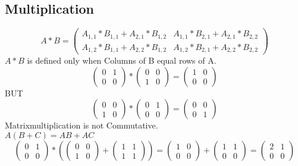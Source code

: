 \documentclass{article}
\begin{document}
	\subsection{Multiplication}
	\begin{equation*} 
		A*B = 
		\begin{pmatrix}
			A_{1,1}*B_{1,1}+A_{2,1}*B_{1,2} & A_{1,1}*B_{2,1}+A_{2,1}*B_{2,2} \\
			A_{1,2}*B_{1,1}+A_{2,2}*B_{1,2} & A_{1,2}*B_{2,1}+A_{2,2}*B_{2,2}
		\end{pmatrix}
	\end{equation*}
	$A*B$ is defined only when Columns of B equal rows of A.\\
	\begin{equation*} 
		\begin{pmatrix}
			0 & 1 \\
			0 & 0
		\end{pmatrix}
		*
		\begin{pmatrix}
			0 & 0 \\
			1 & 0
		\end{pmatrix} 
		= 
		\begin{pmatrix}
			1 & 0 \\
			0 & 0
		\end{pmatrix}
	\end{equation*}
	BUT\\
	\begin{equation*} 
	\begin{pmatrix}
		0 & 0 \\
		1 & 0
	\end{pmatrix} 
	*
	\begin{pmatrix}
		0 & 1 \\
		0 & 0
	\end{pmatrix}
	= 
	\begin{pmatrix}
		0 & 0 \\
		0 & 1
	\end{pmatrix}
	\end{equation*}
	Matrixmultiplication is not Commutative.\\
	$A(B+C) = AB + AC$
	\begin{equation*} 
		\begin{pmatrix} %
			0 & 1 \\	%
			0 & 0
		\end{pmatrix} 
		*(
		\begin{pmatrix} %
			0 & 0 \\	%
			1 & 0
		\end{pmatrix}
		+ 
		\begin{pmatrix} %
			1 & 1 \\	%
			1 & 1
		\end{pmatrix}
		) =
		\begin{pmatrix} %
			1 & 0 \\	%
			0 & 0
		\end{pmatrix}
		+
		\begin{pmatrix} %
			1 & 1 \\	%
			0 & 0
		\end{pmatrix}
		=
		\begin{pmatrix} %
			2 & 1 \\	%
			0 & 0
		\end{pmatrix} 
		\end{equation*}
\end{document}
